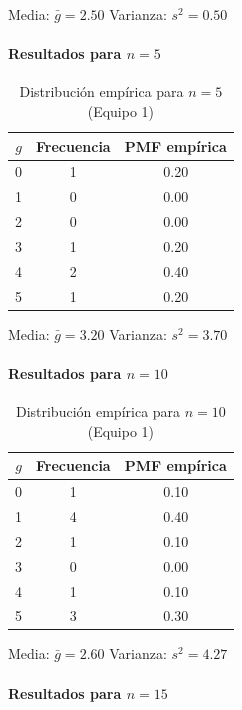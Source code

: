 Media: \(\bar{g}=2.50\) \quad Varianza: \(s^2=0.50\)

\paragraph{\texorpdfstring{Resultados para \(n=5\)}{Resultados para n=5}}

\begin{table}[H]
\centering
\begin{tabular}{ccc}
\toprule
\(g\) & Frecuencia & PMF empírica \\
\midrule
0 & 1 & 0.20 \\
1 & 0 & 0.00 \\
2 & 0 & 0.00 \\
3 & 1 & 0.20 \\
4 & 2 & 0.40 \\
5 & 1 & 0.20 \\
\bottomrule
\end{tabular}
\caption{Distribución empírica para \(n=5\) (Equipo 1)}
\end{table}

Media: \(\bar{g}=3.20\) \quad Varianza: \(s^2=3.70\)

\paragraph{\texorpdfstring{Resultados para \(n=10\)}{Resultados para n=10}}

\begin{table}[H]
\centering
\begin{tabular}{ccc}
\toprule
\(g\) & Frecuencia & PMF empírica \\
\midrule
0 & 1 & 0.10 \\
1 & 4 & 0.40 \\
2 & 1 & 0.10 \\
3 & 0 & 0.00 \\
4 & 1 & 0.10 \\
5 & 3 & 0.30 \\
\bottomrule
\end{tabular}
\caption{Distribución empírica para \(n=10\) (Equipo 1)}
\end{table}

Media: \(\bar{g}=2.60\) \quad Varianza: \(s^2=4.27\)

\paragraph{\texorpdfstring{Resultados para \(n=15\)}{Resultados para n=15}}

